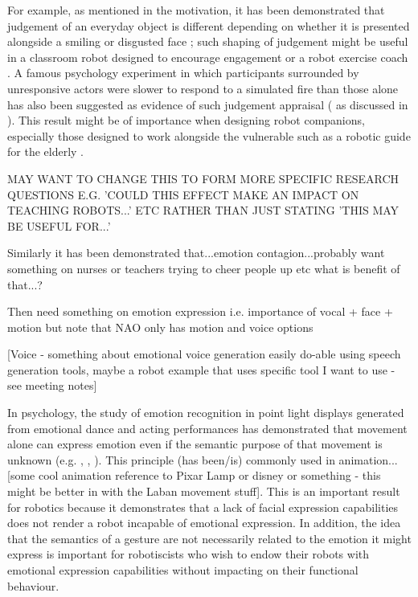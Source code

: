 \documentclass[11pt]{article}
\begin{document}
For example, as mentioned in the motivation, it has been demonstrated that judgement of an everyday object is different depending on whether it is presented alongside a smiling or disgusted face \cite{bayliss2007affective}; such shaping of judgement might be useful in a classroom robot designed to encourage engagement \cite{shiomi2015can} or a robot exercise coach \cite{fasola2010robot}. A famous psychology experiment in which participants surrounded by unresponsive actors were slower to respond to a simulated fire than those alone has also been suggested as evidence of such judgement appraisal (\cite{latane1968group} as discussed in \cite{parkinson2011interpersonal}). This result might be of importance when designing robot companions, especially those designed to work alongside the vulnerable such as a robotic guide for the elderly \cite{montemerlo2002experiences}.

MAY WANT TO CHANGE THIS TO FORM MORE SPECIFIC RESEARCH QUESTIONS E.G. 'COULD THIS EFFECT MAKE AN IMPACT ON TEACHING ROBOTS...' ETC RATHER THAN JUST STATING 'THIS MAY BE USEFUL FOR...'

Similarly it has been demonstrated that...emotion contagion...probably want something on nurses or teachers trying to cheer people up etc what is benefit of that...?

Then need something on emotion expression i.e. importance of vocal + face + motion but note that NAO only has motion and voice options

[Voice - something about emotional voice generation easily do-able using speech generation tools, maybe a robot example that uses specific tool I want to use - see meeting notes]

In psychology, the study of emotion recognition in point light displays generated from emotional dance and acting performances has demonstrated that movement alone can express emotion even if the semantic purpose of that movement is unknown (e.g. \cite{dittrich1996perception}, \cite{pollick2001perceiving}, \cite{atkinson2004emotion}). This principle (has been/is) commonly used in animation...[some cool animation reference to Pixar Lamp or disney or something - this might be better in with the Laban movement stuff]. This is an important result for robotics because it demonstrates that a lack of facial expression capabilities does not render a robot incapable of emotional expression. In addition, the idea that the semantics of a gesture are not necessarily related to the emotion it might express is important for robotiscists who wish to endow their robots with emotional expression capabilities without impacting on their functional behaviour. 
\end{document}
